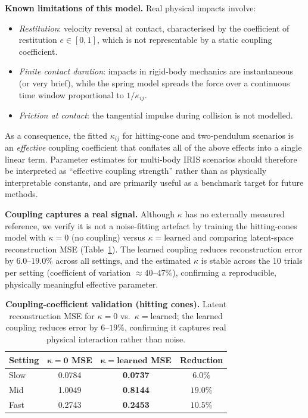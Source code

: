 \documentclass[runningheads]{llncs}
\begin{document}
\textbf{Known limitations of this model.}
Real physical impacts involve:
\begin{itemize}[noitemsep]
  \item \textit{Restitution}: velocity reversal at contact, characterised
    by the coefficient of restitution $e \in [0,1]$, which is not
    representable by a static coupling coefficient.
  \item \textit{Finite contact duration}: impacts in rigid-body mechanics
    are instantaneous (or very brief), while the spring model spreads
    the force over a continuous time window proportional to $1/\kappa_{ij}$.
  \item \textit{Friction at contact}: the tangential impulse during
    collision is not modelled.
\end{itemize}

As a consequence, the fitted $\kappa_{ij}$ for hitting-cone and
two-pendulum scenarios is an \emph{effective} coupling coefficient that
conflates all of the above effects into a single linear term.
Parameter estimates for multi-body IRIS scenarios should therefore
be interpreted as ``effective coupling strength'' rather than as
physically interpretable constants, and are primarily useful as a
benchmark target for future methods.

\textbf{Coupling captures a real signal.} Although $\kappa$ has no externally
measured reference, we verify it is not a noise-fitting artefact by training
the hitting-cones model with $\kappa{=}0$ (no coupling) versus
$\kappa{=}\text{learned}$ and comparing latent-space reconstruction MSE
(Table~\ref{tab:kappa_ablation}). The learned coupling reduces reconstruction
error by $6.0$--$19.0\%$ across all settings, and the estimated $\kappa$ is
stable across the 10 trials per setting (coefficient of variation
${\approx}40$--$47\%$), confirming a reproducible, physically meaningful
effective parameter.

\begin{table}[h]
  \centering
  \caption{\textbf{Coupling-coefficient validation (hitting cones).} Latent
  reconstruction MSE for $\kappa{=}0$ vs.\ $\kappa{=}\text{learned}$; the
  learned coupling reduces error by $6$--$19\%$, confirming it captures real
  physical interaction rather than noise.}
  \label{tab:kappa_ablation}
  \footnotesize
  \setlength{\tabcolsep}{5pt}
  \renewcommand{\arraystretch}{1.15}
  \begin{tabular}{@{}lccc@{}}
    \toprule
    \textbf{Setting} & $\bm{\kappa{=}0}$ \textbf{MSE} & $\bm{\kappa{=}\text{learned}}$ \textbf{MSE} & \textbf{Reduction} \\
    \midrule
    Slow & 0.0784 & \cellcolor{bestcolor}\textbf{0.0737} & $6.0\%$ \\
    Mid  & 1.0049 & \cellcolor{bestcolor}\textbf{0.8144} & $19.0\%$ \\
    Fast & 0.2743 & \cellcolor{bestcolor}\textbf{0.2453} & $10.5\%$ \\
    \bottomrule
  \end{tabular}
\end{table}
\end{document}
